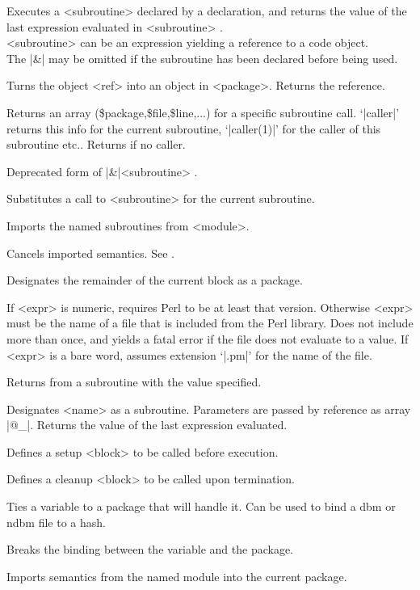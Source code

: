 \documentclass{refbase}
\begin{document}
\begin{enum}{1cm}

Executes a <subroutine> declared by a  declaration, and
returns the value of the last expression evaluated in <subroutine> .
\\
<subroutine> can be an expression yielding a reference to a code object.
\\
The |&| may be omitted if the subroutine has been declared 
before being used.

Turns the object <ref> into an object in <package>.
Returns the reference.

Returns an array (\$package,\$file,\$line,...) for a specific subroutine
call. `|caller|' returns this info for the current subroutine,
`|caller(1)|' for the caller of this subroutine etc..  
Returns \false{} if no caller.

Deprecated form of |&|<subroutine> .

Substitutes a call to <subroutine> for the current subroutine.

Imports the named subroutines from <module>.

Cancels imported semantics. See .

Designates the remainder of the current block as a package.

If <expr> is numeric, requires Perl to be at least that version.
Otherwise <expr> must be the name of a file that is included from
the Perl library. Does not include
more than once, and yields a fatal error if the file does not evaluate
to a \true{} value.
\newline If <expr> is a bare word, assumes extension `|.pm|'
for the name of the file.

Returns from a subroutine with the value specified.

Designates <name> as a subroutine. Parameters are passed by reference
as array |@_|. Returns the value of the last expression evaluated. 

Defines a setup <block> to be called before execution.

Defines a cleanup <block> to be called upon termination.

Ties a variable to a package that will handle it.
Can be used to bind a dbm or ndbm file to a hash. 

Breaks the binding between the variable and the package.

Imports semantics from the named module into the current package.

\end{enum}
\end{document}
